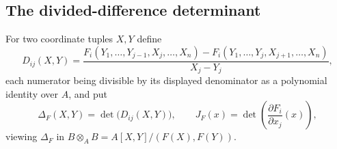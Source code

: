 \documentclass[11pt,letterpaper]{article}
\numberwithin{equation}{section}
\theoremstyle{definition}
\theoremstyle{remark}\newtheorem{remark}[theorem]{Remark}
\begin{document}
\subsection{The divided-difference determinant}
For two coordinate tuples $X,Y$ define
\begin{equation}\label{polynomial:eq:divideddiffmatrix}
 D_{ij}(X,Y)=\frac{F_i(Y_1,\ldots,Y_{j-1},X_j,\ldots,X_n)
 -F_i(Y_1,\ldots,Y_j,X_{j+1},\ldots,X_n)}{X_j-Y_j},
\end{equation}
each numerator being divisible by its displayed denominator as a polynomial
identity over $A$, and put
\begin{equation}\label{polynomial:eq:multibezout}
 \Delta_F(X,Y)=\det\bigl(D_{ij}(X,Y)\bigr),\qquad
 J_F(x)=\det\left(\frac{\partial F_i}{\partial x_j}(x)\right),
\end{equation}
viewing $\Delta_F$ in $B\otimes_AB=A[X,Y]/(F(X),F(Y))$.
\end{document}
